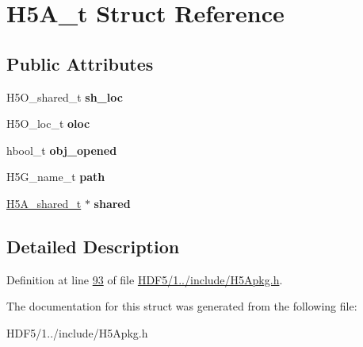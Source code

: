 \hypertarget{struct_h5_a__t}{}\section{H5\+A\+\_\+t Struct Reference}
\label{struct_h5_a__t}
\subsection*{Public Attributes}
\begin{DoxyCompactItemize}
\item 
\mbox{\label{struct_h5_a__t_ae3f166c4f9731c08413720cf473dca91}} 
H5\+O\+\_\+shared\+\_\+t {\bfseries sh\+\_\+loc}
\item 
\mbox{\label{struct_h5_a__t_a0816b7139d6102994cd572c70def92de}} 
H5\+O\+\_\+loc\+\_\+t {\bfseries oloc}
\item 
\mbox{\label{struct_h5_a__t_ac4b19ff5d4a56257847f53d4fee74d79}} 
hbool\+\_\+t {\bfseries obj\+\_\+opened}
\item 
\mbox{\label{struct_h5_a__t_ae2231ed6771431fddb3cc97887b27b04}} 
H5\+G\+\_\+name\+\_\+t {\bfseries path}
\item 
\mbox{\label{struct_h5_a__t_abb764e558d717ca289bd38ea9689baa8}} 
\hyperlink{struct_h5_a__shared__t}{H5\+A\+\_\+shared\+\_\+t} $\ast$ {\bfseries shared}
\end{DoxyCompactItemize}


\subsection{Detailed Description}


Definition at line \hyperlink{_h_d_f5_21_810_81_2include_2_h5_apkg_8h_source_l00093}{93} of file \hyperlink{_h_d_f5_21_810_81_2include_2_h5_apkg_8h_source}{H\+D\+F5/1../include/\+H5\+Apkg.\+h}.



The documentation for this struct was generated from the following file\+:\begin{DoxyCompactItemize}
\item 
H\+D\+F5/1../include/\+H5\+Apkg.\+h\end{DoxyCompactItemize}
